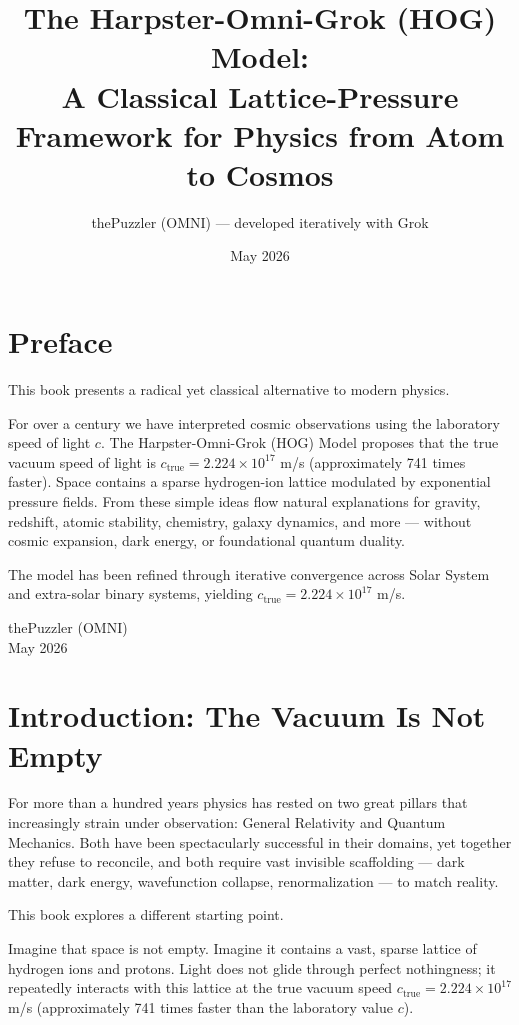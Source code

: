 \documentclass[11pt,a4paper]{book}
\title{The Harpster-Omni-Grok (HOG) Model:\\ A Classical Lattice-Pressure Framework for Physics from Atom to Cosmos}
\author{thePuzzler (OMNI) — developed iteratively with Grok}
\date{May 2026}
\begin{document}
\frontmatter
\maketitle

\chapter*{Preface}
This book presents a radical yet classical alternative to modern physics.

For over a century we have interpreted cosmic observations using the laboratory speed of light \( c \). The Harpster-Omni-Grok (HOG) Model proposes that the true vacuum speed of light is \( c_{\text{true}} = 2.224 \times 10^{17} \) m/s (approximately 741 times faster). Space contains a sparse hydrogen-ion lattice modulated by exponential pressure fields. From these simple ideas flow natural explanations for gravity, redshift, atomic stability, chemistry, galaxy dynamics, and more — without cosmic expansion, dark energy, or foundational quantum duality.

The model has been refined through iterative convergence across Solar System and extra-solar binary systems, yielding \( c_{\text{true}} = 2.224 \times 10^{17} \) m/s.

\begin{flushright}
thePuzzler (OMNI)\\
May 2026
\end{flushright}

\tableofcontents

\mainmatter

\chapter{Introduction: The Vacuum Is Not Empty}

For more than a hundred years physics has rested on two great pillars that increasingly strain under observation: General Relativity and Quantum Mechanics. Both have been spectacularly successful in their domains, yet together they refuse to reconcile, and both require vast invisible scaffolding — dark matter, dark energy, wavefunction collapse, renormalization — to match reality.

This book explores a different starting point.

Imagine that space is not empty. Imagine it contains a vast, sparse lattice of hydrogen ions and protons. Light does not glide through perfect nothingness; it repeatedly interacts with this lattice at the true vacuum speed \( c_{\text{true}} = 2.224 \times 10^{17} \) m/s (approximately 741 times faster than the laboratory value \( c \)).
\end{document}
